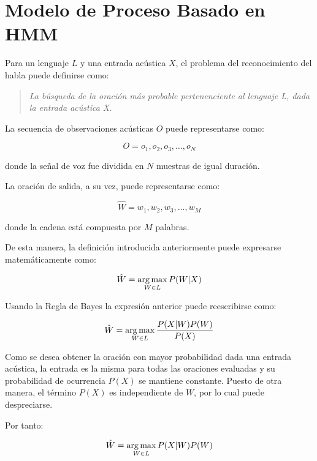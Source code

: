 \section{Modelo de Proceso Basado en HMM}
\label{sec:ModeloHMM}

Para un lenguaje $L$ y una entrada ac\'ustica $X$, el problema del reconocimiento del habla puede definirse como:

\begin{quote}
\emph{La b\'usqueda de la oraci\'on m\'as probable pertenenciente al lenguaje L, dada la entrada ac\'ustica X.}
\end{quote}

La secuencia de observaciones ac\'usticas $O$ puede representarse como:

\begin{equation*}
O = o_1,o_2,o_3,\ldots,o_N
\end{equation*}

donde la se\~nal de voz fue dividida en $N$ muestras de igual duraci\'on.

La oraci\'on de salida, a su vez, puede representarse como:

\begin{equation*}
\hat{W}  = w_1,w_2,w_3,\ldots,w_M
\end{equation*}

donde la cadena est\'a compuesta por $M$ palabras.

De esta manera, la definici\'on introducida anteriormente puede expresarse matem\'aticamente como:

\begin{equation*}
\hat{W} = \operatorname*{arg\,max}_{W \in L} P(W|X)
\end{equation*}

Usando la Regla de Bayes la expresi\'on anterior puede reescribirse como:

\begin{equation*}
\hat{W} = \operatorname*{arg\,max}_{W \in L} \frac{P(X|W)P(W)}{P(X)}
\end{equation*}

Como se desea obtener la oraci\'on con mayor probabilidad dada una entrada ac\'ustica, la entrada es
la misma para todas las oraciones evaluadas y su probabilidad de ocurrencia $P(X)$ se mantiene constante.
Puesto de otra manera, el t\'ermino $P(X)$ es independiente de $W$, por lo cual puede despreciarse. 

Por tanto:

\begin{equation*}
\hat{W} = \operatorname*{arg\,max}_{W \in L} P(X|W)P(W)
\end{equation*}

